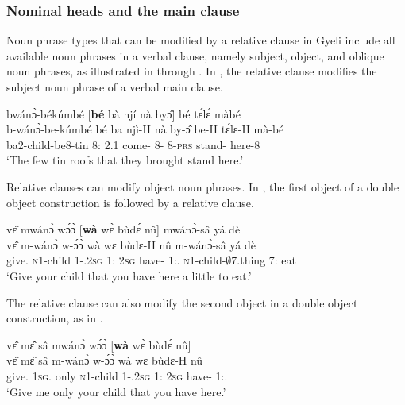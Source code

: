 \subsubsection{Nominal heads and the main clause}
\label{sec:NPheads}

Noun phrase types that can be modified by a relative clause in Gyeli include all available noun phrases in a verbal clause, namely subject, object, and oblique noun phrases, as illustrated in  through .
In , the relative clause modifies the subject noun phrase of a verbal main clause.


\ea\label{REL1}
 \glll  bwánɔ̀-békúmbé [{\bfseries bé} bà njí nà byɔ̂]\textsubscript{{\REL}} bé tɛ́lɛ́ màbé\\
         b-wánɔ̀-be-kúmbé {\db}bé ba njì-H nà by-ɔ̂ be-H tɛ́lɛ-H mà-bé\\
          ba2-child-be8-tin {\db}8:{\ATT} 2.{\PST}1 come-{\R} {\COM} 8-{\OBJ} 8-\textsc{prs} stand-{\R} here-8\\
    \trans `The few tin roofs that they brought stand here.'
\z

Relative clauses can modify object noun phrases. In , the first object of a double object construction is followed by a relative clause.


\ea\label{REL4a} 
  \glll  vɛ̂ mwánɔ̀ wɔ́ɔ̀ [{\bfseries wà} wɛ̀ bùdɛ́ nû]\textsubscript{{\REL}} mwánɔ̀-sâ yá dè \\
         vɛ̂ m-wánɔ̀ w-ɔ́ɔ̀ {\db}wà wɛ bùdɛ-H nû m-wánɔ̀-sâ yá dè \\
          give.{\IMP} \textsc{n}1-child 1-{\POSS}.2\textsc{sg} {\db}1:{\ATT} 2\textsc{sg} have-{\R} 1:{\DEM}.{\PROX} \textsc{n}1-child-$\emptyset$7.thing 7:{\ATT} eat \\
    \trans `Give your child that you have here a little to eat.'
\z

\noindent The relative clause can also modify the second object in a double object construction, as in .


\ea\label{REL4b} 
  \glll  vɛ̂ mɛ̂ sâ mwánɔ̀ wɔ́ɔ̀ [{\bfseries wà} wɛ̀ bùdɛ́ nû]\textsubscript{{\REL}} \\
         vɛ̂ mɛ̂ sâ m-wánɔ̀ w-ɔ́ɔ̀ {\db}wà wɛ bùdɛ-H nû \\
          give.{\IMP} 1\textsc{sg}.{\OBJ} only \textsc{n}1-child 1-{\POSS}.2\textsc{sg} {\db}1:{\ATT} 2\textsc{sg} have-{\R} 1:{\DEM}.{\PROX} \\
    \trans `Give me only your child that you have here.'
\z


